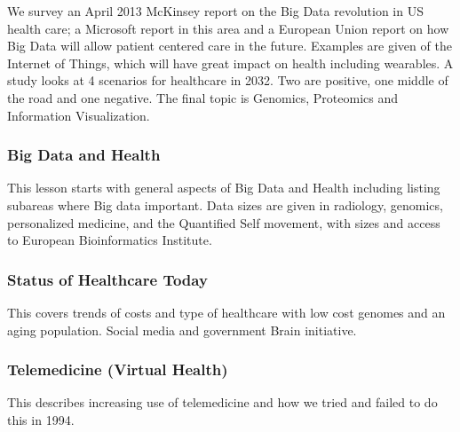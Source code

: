 We survey an April 2013 McKinsey report on the Big Data revolution in US
health care; a Microsoft report in this area and a European Union report
on how Big Data will allow patient centered care in the future. Examples
are given of the Internet of Things, which will have great impact on
health including wearables. A study looks at 4 scenarios for healthcare
in 2032. Two are positive, one middle of the road and one negative. The
final topic is Genomics, Proteomics and Information Visualization.

\subsubsection{Big Data and Health}\label{big-data-and-health}

This lesson starts with general aspects of Big Data and Health including
listing subareas where Big data important. Data sizes are given in
radiology, genomics, personalized medicine, and the Quantified Self
movement, with sizes and access to European Bioinformatics Institute.


\subsubsection{Status of Healthcare
Today}\label{status-of-healthcare-today}

This covers trends of costs and type of healthcare with low cost genomes
and an aging population. Social media and government Brain initiative.


\subsubsection{Telemedicine (Virtual
Health)}\label{telemedicine-virtual-health}

This describes increasing use of telemedicine and how we tried and
failed to do this in 1994.


\begin{comment}
\subsubsection{Big Data and Healthcare
Industry}\label{big-data-and-healthcare-industry}

Summary of an industry survey by GE and Accenture.

\video{Health}{10:02}{Big Data and Healthcare Indusry}{https://www.youtube.com/watch?v=64YOUnRJVZU}
\end{comment}

